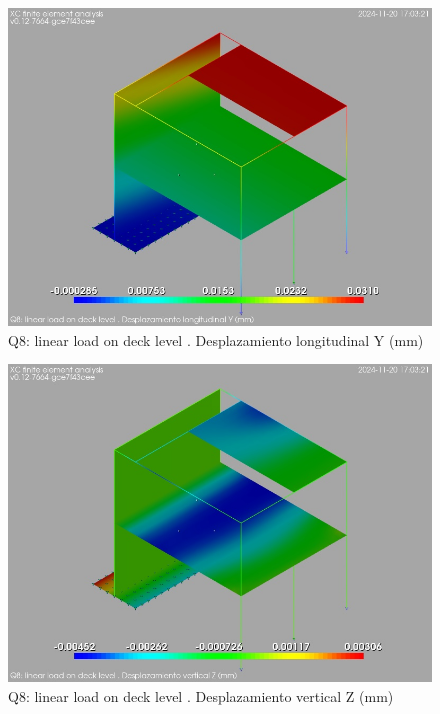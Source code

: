 \begin{figure}[ht]
\begin{center}
\includegraphics[width=\linewidth]{results/graphics/resSimplLC/qlinDeckuY.png}
\caption{Q8: linear load on deck level . Desplazamiento longitudinal Y (mm)}
\label{qlinDeckuY}
\end{center}
\end{figure}
\begin{figure}[ht]
\begin{center}
\includegraphics[width=\linewidth]{results/graphics/resSimplLC/qlinDeckuZ.png}
\caption{Q8: linear load on deck level . Desplazamiento vertical Z (mm)}
\label{qlinDeckuZ}
\end{center}
\end{figure}
